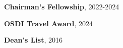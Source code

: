 
\begin{zitemize}
    \item \textbf{Chairman's Fellowship}, 2022-2024
    \item \textbf{OSDI Travel Award}, 2024
    \item \textbf{Dean's List}, 2016
\end{zitemize}
